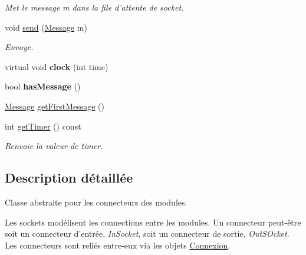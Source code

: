 \begin{DoxyCompactItemize}
\begin{DoxyCompactList}\small\item\em Met le message m dans la file d'attente de socket. \end{DoxyCompactList}\item 
\hypertarget{classSocket_af7fb88a308724635a3ca3ed040b87b1a}{void \hyperlink{classSocket_af7fb88a308724635a3ca3ed040b87b1a}{send} (\hyperlink{classMessage}{Message} m)}\label{classSocket_af7fb88a308724635a3ca3ed040b87b1a}

\begin{DoxyCompactList}\small\item\em Envoye. \end{DoxyCompactList}\item 
\hypertarget{classSocket_a6bd5bddfabd838a3388b445c21d3c41e}{virtual void {\bfseries clock} (int time)}\label{classSocket_a6bd5bddfabd838a3388b445c21d3c41e}

\item 
\hypertarget{classSocket_afe7c9b2ef7fb3653b14f5f462293549a}{bool {\bfseries has\-Message} ()}\label{classSocket_afe7c9b2ef7fb3653b14f5f462293549a}

\item 
\hyperlink{classMessage}{Message} \hyperlink{classSocket_a11216b0cc55de06256500e7b67faa24d}{get\-First\-Message} ()
\item 
\hypertarget{classSocket_aa890633022a29b56ed3844684d32e0fc}{int \hyperlink{classSocket_aa890633022a29b56ed3844684d32e0fc}{get\-Timer} () const }\label{classSocket_aa890633022a29b56ed3844684d32e0fc}

\begin{DoxyCompactList}\small\item\em Renvoie la valeur de timer. \end{DoxyCompactList}\end{DoxyCompactItemize}


\subsection{Description détaillée}
Classe abstraite pour les connecteurs des modules. 

Les sockets modélisent les connections entre les modules. Un connecteur peut-\/être soit un connecteur d'entrée, {\itshape In\-Socket}, soit un connecteur de sortie, {\itshape Out\-S\-Ocket}. Les connecteurs sont reliés entre-\/eux via les objets \hyperlink{classConnexion}{Connexion}. 

